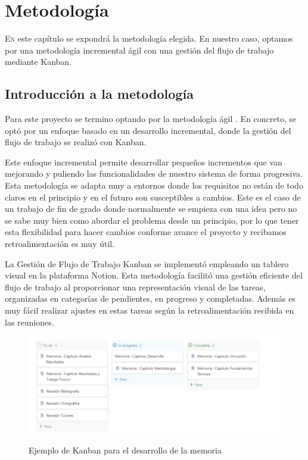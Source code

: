 \chapter{Metodología}
\label{chap:metodologia}

\lettrine{E}{n} este capítulo se expondrá la metodología elegida. En nuestro caso, optamos por una metodología incremental ágil con una gestión del flujo de trabajo mediante Kanban.

\section{Introducción a la metodología}

Para este proyecto se termino optando por la metodología ágil \cite{scrum}. En concreto, se optó por un enfoque basado en un desarrollo incremental, donde la gestión del flujo de trabajo se realizó con Kanban.


Este enfoque incremental permite desarrollar pequeños incrementos que van mejorando y puliendo las funcionalidades de nuestro sistema de forma progresiva. Esta metodología se adapta muy a entornos donde los requisitos no están de todo claros en el principio y en el futuro son susceptibles a cambios. Este es el caso de un trabajo de fin de grado donde normalmente se empieza con una idea pero no se sabe muy bien como abordar el problema desde un principio, por lo que tener esta flexibilidad para hacer cambios conforme avance el proyecto y recibamos retroalimentación es muy útil. 

La Gestión de Flujo de Trabajo Kanban se implementó empleando un tablero visual en la plataforma Notion. Esta metodología facilitó una gestión eficiente del flujo de trabajo al proporcionar una representación visual de las tareas, organizadas en categorías de pendientes, en progreso y completadas. Además es muy fácil realizar ajustes en estas tareas según la retroalimentación recibida en las reuniones.


\begin{figure}[h]
\centering
\includegraphics[width=14cm]{imaxes/kanban.png}
\label{fig:pointnetc}
\caption{Ejemplo de Kanban para el desarrollo de la memoria}
\end{figure}



